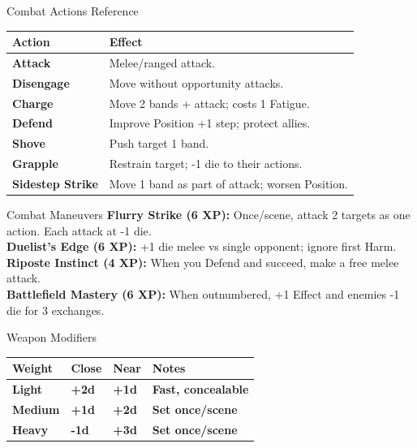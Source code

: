 \documentclass[10pt]{article}
\begin{document}
\begin{minipage}[t]{0.48\linewidth}
    \begin{charbox}{Combat Actions Reference}
        \begin{tabular}{>{\bfseries}p{3cm} p{4.5cm}}
            \toprule
            \textbf{Action} & \textbf{Effect} \\
            \midrule
            Attack & Melee/ranged attack. \\
            Disengage & Move without opportunity attacks. \\
            Charge & Move 2 bands + attack; costs 1 Fatigue. \\
            Defend & Improve Position +1 step; protect allies. \\
            Shove & Push target 1 band. \\
            Grapple & Restrain target; -1 die to their actions. \\
            Sidestep Strike & Move 1 band as part of attack; worsen Position. \\
            \bottomrule
        \end{tabular}
    \end{charbox}
    
    \vspace{0.5em}
    
    \begin{charbox}{Combat Maneuvers}
        \textbf{Flurry Strike (6 XP):} Once/scene, attack 2 targets as one action. Each attack at -1 die.\\
        \textbf{Duelist's Edge (6 XP):} +1 die melee vs single opponent; ignore first Harm.\\
        \textbf{Riposte Instinct (4 XP):} When you Defend and succeed, make a free melee attack.\\
        \textbf{Battlefield Mastery (6 XP):} When outnumbered, +1 Effect and enemies -1 die for 3 exchanges.
    \end{charbox}
    
    \vspace{0.5em}
    
    \begin{charbox}{Weapon Modifiers}
        \begin{tabular}{>{\bfseries}p{2cm} >{\bfseries}p{2cm} >{\bfseries}p{2cm} >{\bfseries}p{2cm}}
            \toprule
            \textbf{Weight} & \textbf{Close} & \textbf{Near} & \textbf{Notes} \\
            \midrule
            Light & +2d & +1d & Fast, concealable \\
            Medium & +1d & +2d & Set once/scene \\
            Heavy & -1d & +3d & Set once/scene \\
            \bottomrule
        \end{tabular}
    \end{charbox}
    

\end{minipage}
\end{document}

